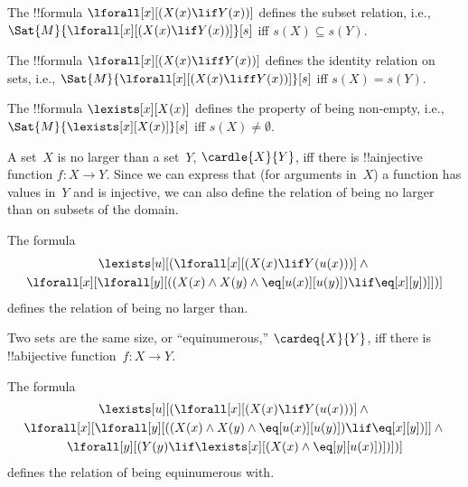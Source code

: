 \documentclass[../../../include/open-logic-section]{subfiles}
\begin{document}


\begin{prop}
The !!{formula} $\lforall[x][(X(x) \lif Y(x))]$ defines the subset
relation, i.e., $\Sat{M}{\lforall[x][(X(x) \lif Y(x))]}[s]$ iff $s(X)
\subseteq s(Y)$.
\end{prop}

\begin{prop}
The !!{formula} $\lforall[x][(X(x) \liff Y(x))]$ defines the identity
relation on sets, i.e., $\Sat{M}{\lforall[x][(X(x) \liff Y(x))]}[s]$
iff $s(X) = s(Y)$.
\end{prop}

\begin{prop}
The !!{formula} $\lexists[x][X(x)]$ defines the property of being
non-empty, i.e., $\Sat{M}{\lexists[x][X(x)]}[s]$ iff $s(X) \neq
\emptyset$.
\end{prop}

A set~$X$ is no larger than a set~$Y$, $\cardle{X}{Y}$, iff there is
!!a{injective} function $f\colon X \to Y$.  Since we can express that
(for arguments in~$X$) a function has values in~$Y$ and is injective, we
can also define the relation of being no larger than on subsets of the
domain.

\begin{prop}
The formula
\begin{multline*}
\lexists[u][(\lforall[x][(X(x) \lif Y(u(x)))] \land {}\\
\lforall[x][\lforall[y][((X(x) \land X(y) \land \eq[u(x)][u(y)]) \lif
      \eq[x][y])]])]
\end{multline*}
defines the relation of being no larger than.
\end{prop}

Two sets are the same size, or ``equinumerous,'' $\cardeq{X}{Y}$, iff
there is !!a{bijective} function~$f\colon X \to Y$.

\begin{prop}
The formula
\begin{multline*}
  \lexists[u][(\lforall[x][(X(x) \lif Y(u(x)))] \land {}\\
    \lforall[x][\lforall[y][((X(x) \land X(y) \land \eq[u(x)][u(y)]) \lif \eq[x][y])]]
  \land {} \\\lforall[y][(Y(y) \lif \lexists[x][(X(x)
      \land \eq[y][u(x)])])])]
\end{multline*}
defines the relation of being equinumerous with.
\end{prop}
\end{document}
